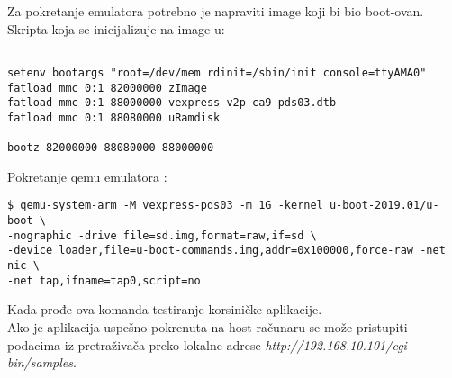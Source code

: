 \documentclass{article}
\begin{document}
Za pokretanje emulatora potrebno je napraviti image koji bi bio boot-ovan. \\


Skripta koja se inicijalizuje na image-u:


\begin{commandline}
  \begin{verbatim}

setenv bootargs "root=/dev/mem rdinit=/sbin/init console=ttyAMA0"
fatload mmc 0:1 82000000 zImage
fatload mmc 0:1 88000000 vexpress-v2p-ca9-pds03.dtb
fatload mmc 0:1 88080000 uRamdisk

bootz 82000000 88080000 88000000

  \end{verbatim}
\end{commandline}


Pokretanje qemu emulatora :

\begin{commandline}
  \begin{verbatim}
$ qemu-system-arm -M vexpress-pds03 -m 1G -kernel u-boot-2019.01/u-boot \
-nographic -drive file=sd.img,format=raw,if=sd \
-device loader,file=u-boot-commands.img,addr=0x100000,force-raw -net nic \
-net tap,ifname=tap0,script=no
  \end{verbatim}
\end{commandline}


Kada prođe ova komanda testiranje korsiničke aplikacije. \\

Ako je aplikacija uspešno pokrenuta na host računaru se može pristupiti podacima iz pretraživača  preko lokalne adrese
\textit{http://192.168.10.101/cgi-bin/samples}.





    
\end{document}

